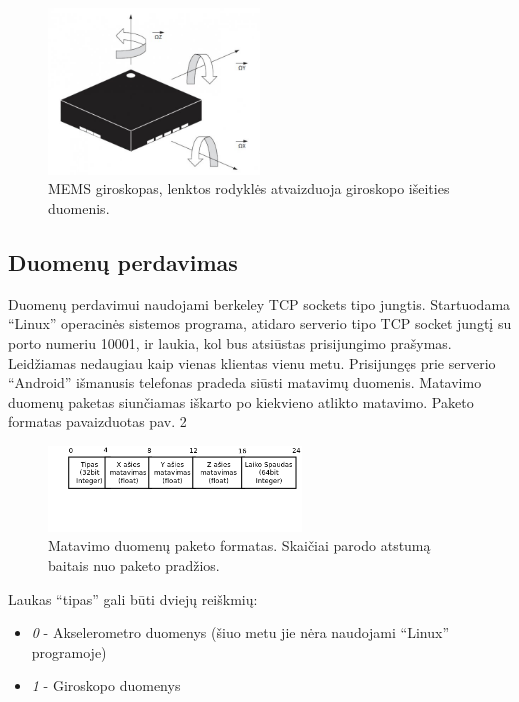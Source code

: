 \documentclass[12pt, a4paper, lithuanian, final]{article}
\begin{document}
\begin{figure}[H]
\begin{center}
\includegraphics[width=0.5\textwidth]{img/gyroscope.jpg}
\caption{MEMS giroskopas, lenktos rodyklės atvaizduoja giroskopo išeities duomenis.}
\end{center}
\end{figure}

\subsection{Duomenų perdavimas}

Duomenų perdavimui naudojami berkeley TCP sockets tipo jungtis.
Startuodama "`Linux"' operacinės sistemos programa, atidaro serverio tipo TCP socket jungtį su porto numeriu 10001, ir laukia, kol bus atsiūstas prisijungimo prašymas.
Leidžiamas nedaugiau kaip vienas klientas vienu metu.
Prisijungęs prie serverio "`Android"' išmanusis telefonas pradeda siūsti matavimų duomenis. Matavimo duomenų paketas siunčiamas iškarto po kiekvieno atlikto matavimo.
Paketo formatas pavaizduotas pav. 2

\begin{figure}[H]
\begin{center}
\includegraphics[width=0.6\textwidth]{img/packet.png}
\caption{Matavimo duomenų paketo formatas. Skaičiai parodo atstumą baitais nuo paketo pradžios.}
\end{center}
\end{figure}

Laukas "`tipas"' gali būti dviejų reiškmių: 
\begin{itemize}
	\item \textit{0} - Akselerometro duomenys (šiuo metu jie nėra naudojami "`Linux"' programoje)
	\item \textit{1} - Giroskopo duomenys
\end{itemize}
\end{document}

